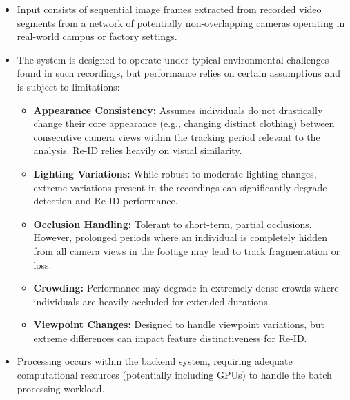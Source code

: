 \begin{itemize}
        \begin{itemize}
            \item Input consists of sequential image frames extracted from recorded video segments from a network of potentially non-overlapping cameras operating in real-world campus or factory settings.
            \item The system is designed to operate under typical environmental challenges found in such recordings, but performance relies on certain assumptions and is subject to limitations:
                \begin{itemize}
                    \item \textbf{Appearance Consistency:} Assumes individuals do not drastically change their core appearance (e.g., changing distinct clothing) between consecutive camera views within the tracking period relevant to the analysis. Re-ID relies heavily on visual similarity.
                    \item \textbf{Lighting Variations:} While robust to moderate lighting changes, extreme variations present in the recordings can significantly degrade detection and Re-ID performance.
                    \item \textbf{Occlusion Handling:} Tolerant to short-term, partial occlusions. However, prolonged periods where an individual is completely hidden from all camera views in the footage may lead to track fragmentation or loss.
                    \item \textbf{Crowding:} Performance may degrade in extremely dense crowds where individuals are heavily occluded for extended durations.
                    \item \textbf{Viewpoint Changes:} Designed to handle viewpoint variations, but extreme differences can impact feature distinctiveness for Re-ID.
                \end{itemize}
            \item Processing occurs within the backend system, requiring adequate computational resources (potentially including GPUs) to handle the batch processing workload.
        \end{itemize}
\end{itemize}

